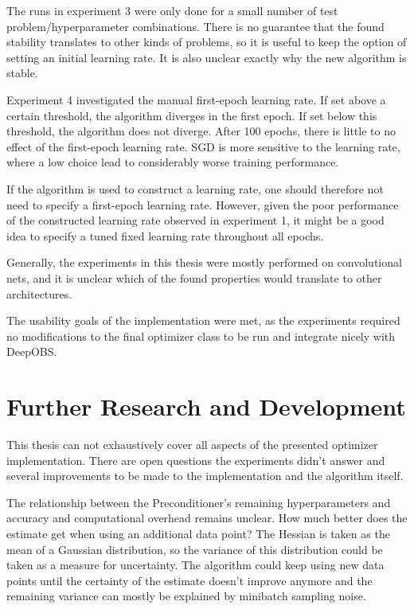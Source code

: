 \documentclass[twoside,12pt,a4paper]{report}
\begin{document}
The runs in experiment 3 were only done for a small number of test problem/hyperparameter combinations. There is no guarantee that the found stability translates to other kinds of problems, so it is useful to keep the option of setting an initial learning rate. It is also unclear exactly why the new algorithm is stable.

Experiment 4 investigated the manual first-epoch learning rate. If set above a certain threshold, the algorithm diverges in the first epoch. If set below this threshold, the algorithm does not diverge. After 100 epochs, there is little to no effect of the first-epoch learning rate. SGD is more sensitive to the learning rate, where a low choice lead to considerably worse training performance.

If the algorithm is used to construct a learning rate, one should therefore not need to specify a first-epoch learning rate. However, given the poor performance of the constructed learning rate observed in experiment 1, it might be a good idea to specify a tuned fixed learning rate throughout all epochs.

Generally, the experiments in this thesis were mostly performed on convolutional nets, and it is unclear which of the found properties would translate to other architectures.

The usability goals of the implementation were met, as the experiments required no modifications to the final optimizer class to be run and integrate nicely with DeepOBS.

\section{Further Research and Development}
This thesis can not exhaustively cover all aspects of the presented optimizer implementation. There are open questions the experiments didn't answer and several improvements to be made to the implementation and the algorithm itself.

The relationship between the Preconditioner's remaining hyperparameters and accuracy and computational overhead remains unclear. How much better does the estimate get when using an additional data point? The Hessian is taken as the mean of a Gaussian distribution, so the variance of this distribution could be taken as a measure for uncertainty. The algorithm could keep using new data points until the certainty of the estimate doesn't improve anymore and the remaining variance can mostly be explained by minibatch sampling noise.
\end{document}

